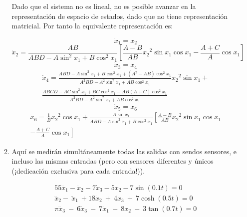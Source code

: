 \documentclass[letterpaper, 12pt]{article}
\begin{document}
\begin{enumerate}
\begin{enumerate}
Dado que el sistema no es lineal, no es posible avanzar en la representación de espacio de estados, dado que no tiene representación matricial. Por tanto la equivalente representación es:
\begin{flushleft}
\begin{equation}
    \dot{x}_1 = x_2
\end{equation}
\begin{equation}
    \dot{x}_2 = \frac{AB}{ABD - A\sin^2 x_1 + B\cos^2 x_1} \left[ \frac{A-B}{AB}{x_2}^2\sin x_1\cos x_1 -\frac{A+C}{A}\cos x_1\right]
\end{equation}
\begin{equation}
    \dot{x}_3 = x_4
\end{equation}
\begin{multline}
    \dot{x}_4 = \frac{ABD - A\sin^2 x_1 + B\cos^2 x_1 + (A^2-AB)\cos^2 x_1}{A^2BD-A^2\sin^2 x_1 + AB\cos^2 x_1} {x_2}^2\sin x_1 + \\
    \frac{ABCD - AC\sin^2 x_1 + BC\cos^2 x_1 - AB(A+C)\cos^2 x_1}{A^2BD - A^2\sin^2 x_1 + AB\cos^2 x_1}
\end{multline}
\begin{equation}
    \dot{x}_5 = x_6
\end{equation}
\begin{multline}
    \dot{x}_6 = \frac{1}{B}{x_2}^2\cos x_1 + \frac{A\sin x_1}{ABD-A\sin^2 x_1 + B\cos^2 x_1} \left[\frac{A-B}{AB}{x_2}^2\sin x_1\cos x_1 \right.\\ \left.-\frac{A+C}{A}\cos x_1 \right]
\end{multline}
\end{flushleft}

\item Aquí se medirán simultáneamente todas las salidas con sendos sensores, e incluso las mismas entradas (pero con sensores diferentes y únicos (¡dedicación exclusiva para cada entrada!)).

\begin{equation}
\begin{split}
    55\dddot{x}_1-\ddot{x}_2-7\dot{x}_3-5x_2-7\sin(0.1t)=0 \\
    {\dddot{x}}_2-\ {\ddot{x}}_1\ +18{\dot{x}}_2\ +\ 4x_3\ +\ 7\cosh(0.5t)=0 \\
    \pi\dddot{x}_3\ -\ 6\ddot{x}_3\ -\ 7\dot{x}_1\ -\ 8x_2\ -\ 3\tan(0.7t) =0 
\end{split}
\end{equation}


\end{enumerate}
\end{enumerate}
\end{document}

